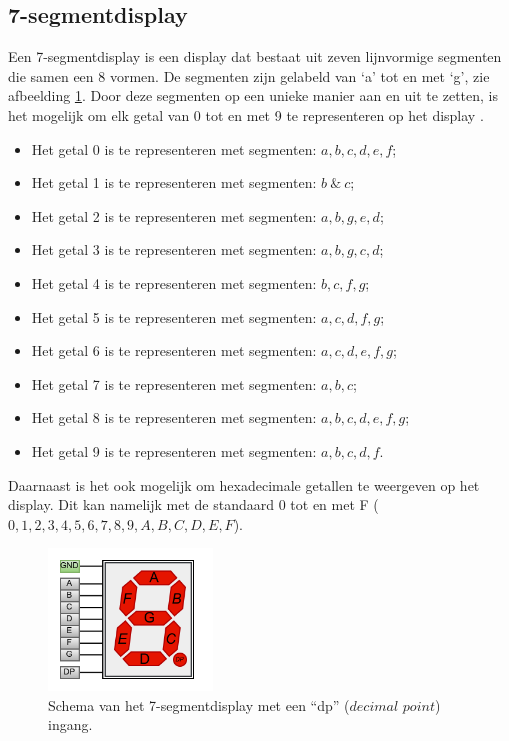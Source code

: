 \documentclass[12pt]{article}
\begin{document}
\subsection{7-segmentdisplay}
Een 7-segmentdisplay is een display dat bestaat uit zeven lijnvormige segmenten die samen een 8 vormen. 
De segmenten zijn gelabeld van `a' tot en met `g', zie afbeelding \ref{fig:39110}. 
Door deze segmenten op een unieke manier aan en uit te zetten, is het mogelijk om elk getal van 0 tot en met 9 te representeren op het display \cite{7seg}. 
\begin{itemize}
    \item Het getal 0 is te representeren met segmenten: $a,b,c,d,e,f$;
    \item Het getal 1 is te representeren met segmenten: $b\ \&\ c$;
    \item Het getal 2 is te representeren met segmenten: $a,b,g,e,d$;
    \item Het getal 3 is te representeren met segmenten: $a,b,g,c,d$;
    \item Het getal 4 is te representeren met segmenten: $b,c,f,g$;
    \item Het getal 5 is te representeren met segmenten: $a,c,d,f,g$;
    \item Het getal 6 is te representeren met segmenten: $a,c,d,e,f,g$;
    \item Het getal 7 is te representeren met segmenten: $a,b,c$;
    \item Het getal 8 is te representeren met segmenten: $a,b,c,d,e,f,g$;
    \item Het getal 9 is te representeren met segmenten: $a,b,c,d,f$.
\end{itemize}
Daarnaast is het ook mogelijk om hexadecimale getallen te weergeven op het display. Dit kan namelijk met de standaard 0 tot en met F ($0,1,2,3,4,5,6,7,8,9,A,B,C,D,E,F$).
\begin{figure}[h]
    \centering
    \includegraphics[width=0.39\textwidth]{7SEGMENT.png}
    \caption{Schema van het 7-segmentdisplay met een ``dp'' ($decimal$ $point$) ingang.}
    \label{fig:39110}
\end{figure}
\pagebreak
\end{document}
